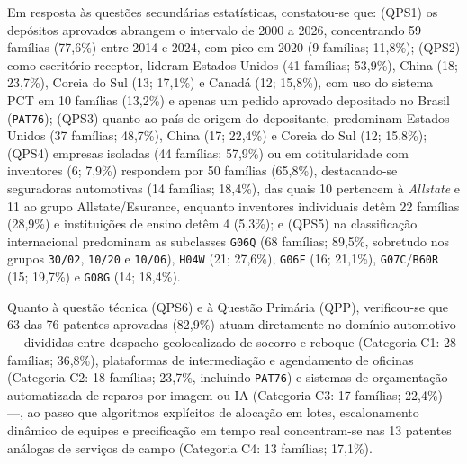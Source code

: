 \documentclass[12pt,a4paper]{article}
\begin{document}
Em resposta às questões secundárias estatísticas, constatou-se que: (QPS1) os depósitos aprovados abrangem o intervalo de 2000 a 2026, concentrando 59 famílias (77,6\%) entre 2014 e 2024, com pico em 2020 (9 famílias; 11,8\%); (QPS2) como escritório receptor, lideram Estados Unidos (41 famílias; 53,9\%), China (18; 23,7\%), Coreia do Sul (13; 17,1\%) e Canadá (12; 15,8\%), com uso do sistema PCT em 10 famílias (13,2\%) e apenas um pedido aprovado depositado no Brasil (\texttt{PAT76}); (QPS3) quanto ao país de origem do depositante, predominam Estados Unidos (37 famílias; 48,7\%), China (17; 22,4\%) e Coreia do Sul (12; 15,8\%); (QPS4) empresas isoladas (44 famílias; 57,9\%) ou em cotitularidade com inventores (6; 7,9\%) respondem por 50 famílias (65,8\%), destacando-se seguradoras automotivas (14 famílias; 18,4\%), das quais 10 pertencem à \textit{Allstate} e 11 ao grupo Allstate/Esurance, enquanto inventores individuais detêm 22 famílias (28,9\%) e instituições de ensino detêm 4 (5,3\%); e (QPS5) na classificação internacional predominam as subclasses \texttt{G06Q} (68 famílias; 89,5\%, sobretudo nos grupos \texttt{30/02}, \texttt{10/20} e \texttt{10/06}), \texttt{H04W} (21; 27,6\%), \texttt{G06F} (16; 21,1\%), \texttt{G07C}/\texttt{B60R} (15; 19,7\%) e \texttt{G08G} (14; 18,4\%).

Quanto à questão técnica (QPS6) e à Questão Primária (QPP), verificou-se que 63 das 76 patentes aprovadas (82,9\%) atuam diretamente no domínio automotivo --- divididas entre despacho geolocalizado de socorro e reboque (Categoria C1: 28 famílias; 36,8\%), plataformas de intermediação e agendamento de oficinas (Categoria C2: 18 famílias; 23,7\%, incluindo \texttt{PAT76}) e sistemas de orçamentação automatizada de reparos por imagem ou IA (Categoria C3: 17 famílias; 22,4\%) ---, ao passo que algoritmos explícitos de alocação em lotes, escalonamento dinâmico de equipes e precificação em tempo real concentram-se nas 13 patentes análogas de serviços de campo (Categoria C4: 13 famílias; 17,1\%).
\end{document}
